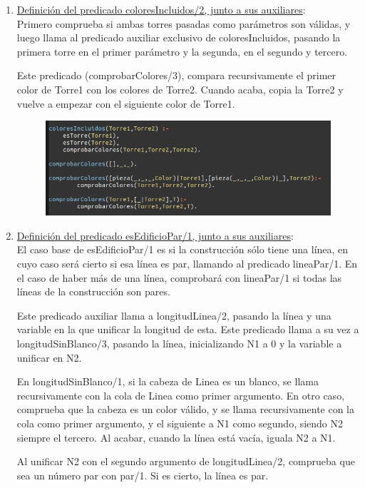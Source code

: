 \documentclass{article}
\begin{document}
\begin{enumerate}
\item  \underline{Definición del predicado coloresIncluidos/2, junto a sus auxiliares}:\\

 Primero comprueba si ambas torres pasadas como parámetros son válidas, y luego llama al predicado auxiliar exclusivo de coloresIncluidos, pasando la primera torre en el primer parámetro y la segunda, en el segundo y tercero.

 Este predicado (comprobarColores/3), compara recursivamente el primer color de Torre1 con los colores de Torre2. Cuando acaba, copia la Torre2 y vuelve a empezar con el siguiente color de Torre1.

\begin{figure}[H]
	\centering
	\includegraphics[width=0.75 \textwidth]{images/coloresIncluidos.png}
\end{figure}


 
\item  \underline{Definición del predicado esEdificioPar/1, junto a sus auxiliares}:\\

 El caso base de esEdificioPar/1 es si la construcción sólo tiene una línea, en cuyo caso será cierto si esa línea es par, llamando al predicado lineaPar/1. En el caso de haber más de una línea, comprobará con lineaPar/1 si todas las líneas de la construcción son pares.

 Este predicado auxiliar llama a longitudLinea/2, pasando la línea y una variable en la que unificar la longitud de esta. Este predicado llama a su vez a longitudSinBlanco/3, pasando la línea, inicializando N1 a 0 y la variable a unificar en N2. 

 En longitudSinBlanco/1, si la cabeza de Linea es un blanco, se llama recursivamente con la cola de Linea como primer argumento. En otro caso, comprueba que la cabeza es un color válido, y se llama recursivamente con la cola como primer argumento, y el siguiente a N1 como segundo, siendo N2 siempre el tercero. Al acabar, cuando la línea está vacía, iguala N2 a N1.

  Al unificar N2 con el segundo argumento de longitudLinea/2, comprueba que sea un número par con par/1. Si es cierto, la línea es par.


\end{enumerate}
\end{document}
